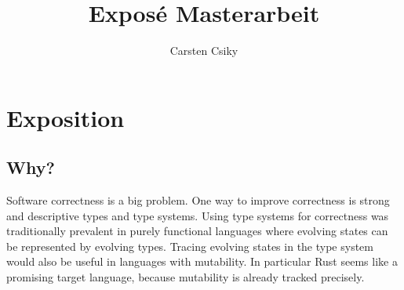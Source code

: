 \documentclass[11pt]{article}
\title{\textbf{Exposé Masterarbeit}}
\author{Carsten Csiky}
\date{}
\begin{document}
\maketitle

\section{Exposition}

\subsection{Why?}


Software correctness is a big problem. One way to improve correctness is strong and descriptive types and type systems. Using type systems for correctness was traditionally prevalent in purely functional languages where evolving states can be represented by evolving types. Tracing evolving states in the type system would also be useful in languages with mutability. In particular Rust seems like a promising target language, because mutability is already tracked precisely.








\end{document}
